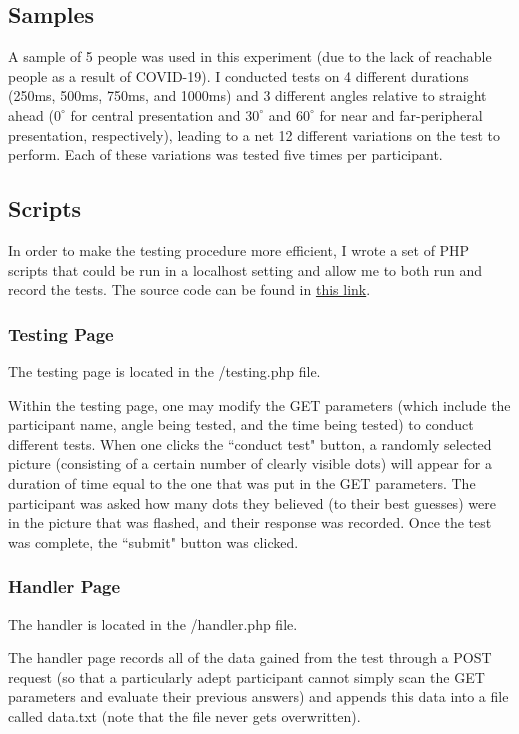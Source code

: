 \documentclass[12pt]{article}
\begin{document}
\subsection{Samples}
A sample of 5 people was used in this experiment (due to the lack of reachable
people as a result of COVID-19). I conducted tests on 4 different
durations (250ms, 500ms, 750ms, and 1000ms) and 3 different angles relative to
straight ahead ($0^{\circ}$ for central presentation and $30^{\circ}$ and
$60^{\circ}$ for near and far-peripheral presentation, respectively),
leading to a net 12 different variations on the test to perform. Each
of these variations was tested five times per participant.

\subsection{Scripts}

In order to make the testing procedure more efficient, I wrote a set of PHP
scripts that could be run in a localhost setting and allow me to both run and record the
tests. The source code can be found in
\href{https://github.com/junikimm717/OMSB9-Final-Project}{this link}.

\subsubsection{Testing Page}
The testing page is located in the /testing.php file.

Within the testing page, one may modify the GET parameters (which include the
participant name, angle being tested, and the time being tested) to
conduct different tests. When one clicks the ``conduct test" button, a randomly
selected picture (consisting of a certain number of clearly visible dots) will
appear for a duration of time equal to the one that was put in the GET
parameters. The participant was asked how many dots they believed (to their
best guesses) were in the picture that was flashed, and their response
was recorded. Once the test was complete, the ``submit" button was clicked.

\subsubsection{Handler Page}
The handler is located in the /handler.php file.

The handler page records all of the data gained from the test through a POST
request (so that a particularly adept participant cannot simply scan the GET
parameters and evaluate their previous answers) and appends this data
into a file called data.txt (note that the file never gets overwritten).
\end{document}
